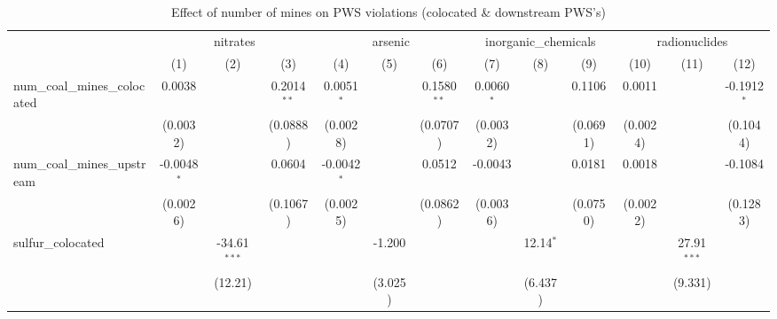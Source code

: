 
\begin{table}[htbp]
   \caption{\label{olsrf2sls_nummine_mine_vio_binary_1985to2005_colocateddownstream} Effect of number of mines on PWS violations (colocated \& downstream PWS's)}
   \bigskip
   \centering
   \begin{adjustbox}{width = \textwidth, center}
      \begin{tabular}{lcccccccccccc}
         \toprule
          & \multicolumn{3}{c}{nitrates} & \multicolumn{3}{c}{arsenic} & \multicolumn{3}{c}{inorganic\_chemicals} & \multicolumn{3}{c}{radionuclides}\\
                                                            & (1)           & (2)            & (3)           & (4)           & (5)           & (6)           & (7)           & (8)           & (9)           & (10)               & (11)          & (12)\\  
         \midrule 
         num\_coal\_mines\_colocated                        & 0.0038        &                & 0.2014$^{**}$ & 0.0051$^{*}$  &               & 0.1580$^{**}$ & 0.0060$^{*}$  &               & 0.1106        & 0.0011             &               & -0.1912$^{*}$\\   
                                                            & (0.0032)      &                & (0.0888)      & (0.0028)      &               & (0.0707)      & (0.0032)      &               & (0.0691)      & (0.0024)           &               & (0.1044)\\   
         num\_coal\_mines\_upstream                         & -0.0048$^{*}$ &                & 0.0604        & -0.0042$^{*}$ &               & 0.0512        & -0.0043       &               & 0.0181        & 0.0018             &               & -0.1084\\   
                                                            & (0.0026)      &                & (0.1067)      & (0.0025)      &               & (0.0862)      & (0.0036)      &               & (0.0750)      & (0.0022)           &               & (0.1283)\\   
         sulfur\_colocated                                  &               & -34.61$^{***}$ &               &               & -1.200        &               &               & 12.14$^{*}$   &               &                    & 27.91$^{***}$ &   \\   
                                                            &               & (12.21)        &               &               & (3.025)       &               &               & (6.437)       &               &                    & (9.331)       &   \\   

\end{tabular}
\end{adjustbox}
\end{table}
